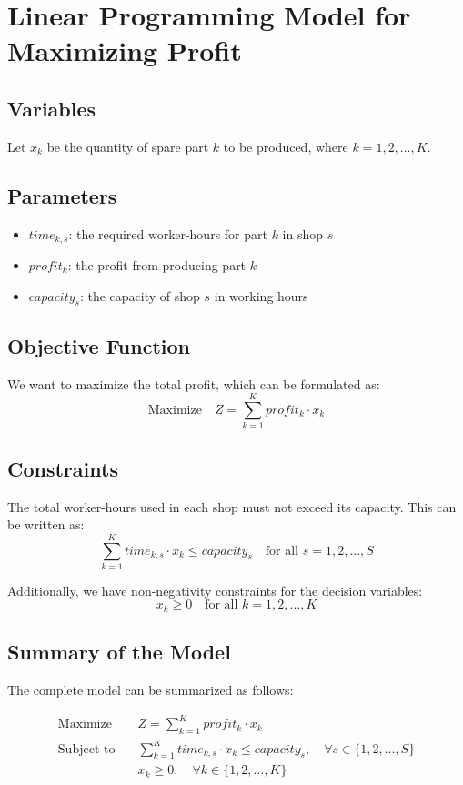 \documentclass{article}
\begin{document}
\section*{Linear Programming Model for Maximizing Profit}

\subsection*{Variables}
Let \( x_k \) be the quantity of spare part \( k \) to be produced, where \( k = 1, 2, \ldots, K \).

\subsection*{Parameters}
\begin{itemize}
    \item \( time_{k,s} \): the required worker-hours for part \( k \) in shop \( s \)
    \item \( profit_k \): the profit from producing part \( k \)
    \item \( capacity_s \): the capacity of shop \( s \) in working hours
\end{itemize}

\subsection*{Objective Function}
We want to maximize the total profit, which can be formulated as:
\[
\text{Maximize} \quad Z = \sum_{k=1}^{K} profit_k \cdot x_k
\]

\subsection*{Constraints}
The total worker-hours used in each shop must not exceed its capacity. This can be written as:
\[
\sum_{k=1}^{K} time_{k,s} \cdot x_k \leq capacity_s \quad \text{for all } s = 1, 2, \ldots, S
\]

Additionally, we have non-negativity constraints for the decision variables:
\[
x_k \geq 0 \quad \text{for all } k = 1, 2, \ldots, K
\]

\subsection*{Summary of the Model}
The complete model can be summarized as follows:

\[
\begin{align*}
\text{Maximize} \quad & Z = \sum_{k=1}^{K} profit_k \cdot x_k \\
\text{Subject to} \quad & \sum_{k=1}^{K} time_{k,s} \cdot x_k \leq capacity_s, \quad \forall s \in \{1, 2, \ldots, S\} \\
& x_k \geq 0, \quad \forall k \in \{1, 2, \ldots, K\}
\end{align*}
\]
\end{document}
